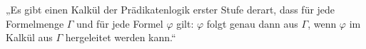 

\begin{theorem}
	„Es gibt einen Kalkül der Prädikatenlogik erster Stufe derart, dass für jede Formelmenge
\( \Gamma \) und für jede Formel
\( \varphi \) gilt:
\( \varphi \) folgt genau dann aus
\( \Gamma \), wenn
\( \varphi \) im Kalkül aus
\( \Gamma \)  hergeleitet werden kann.“
\end{theorem}
